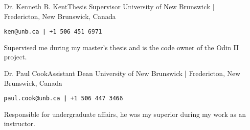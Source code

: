 \documentclass{developercv} %
\begin{document}
\ifdefined{} \fi

\ifdefined{}  \fi

\entrys%
{Dr. Kenneth B. Kent}{Thesis Supervisor}
{University of New Brunswick | Fredericton, New Brunswick, Canada}
{\texttt{ken@unb.ca | +1 506 451 6971}

	Supervised me during my master's thesis and is the code owner of the Odin II project.
}

\entrys%
{Dr. Paul Cook}{Assistant Dean}
{University of New Brunswick | Fredericton, New Brunswick, Canada}
{\texttt{paul.cook@unb.ca | +1 506 447 3466}

	Responsible for undergraduate affairs, he was my superior during my work as an instructor.
}
\end{document}
